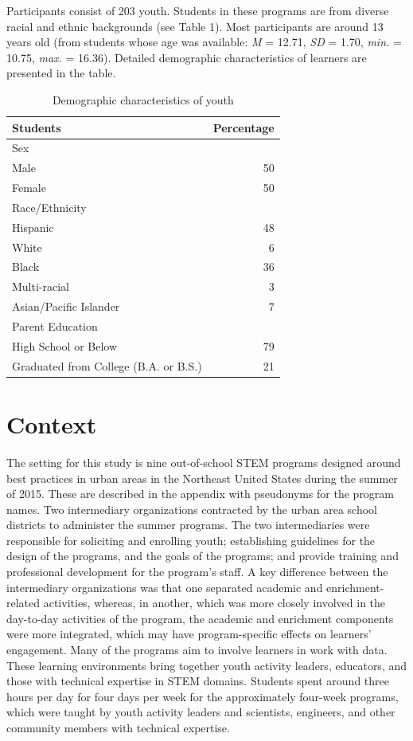 \documentclass[]{book}
\theoremstyle{definition}
\theoremstyle{definition}
\theoremstyle{definition}
\theoremstyle{remark}
\begin{document}
Participants consist of 203 youth. Students in these programs are from
diverse racial and ethnic backgrounds (see Table 1). Most participants
are around 13 years old (from students whose age was available: \emph{M}
= 12.71, \emph{SD} = 1.70, \emph{min.} = 10.75, \emph{max.} = 16.36).
Detailed demographic characteristics of learners are presented in the
table.

\begin{table}

\caption{\label{tab:unnamed-chunk-4}Demographic characteristics of youth}
\centering
\begin{tabular}[t]{lr}
\toprule
Students & Percentage\\
\midrule
Sex & \\
Male & 50\\
Female & 50\\
Race/Ethnicity & \\
Hispanic & 48\\
\addlinespace
White & 6\\
Black & 36\\
Multi-racial & 3\\
Asian/Pacific Islander & 7\\
Parent Education & \\
\addlinespace
High School or Below & 79\\
Graduated from College (B.A. or B.S.) & 21\\
\bottomrule
\end{tabular}
\end{table}

\section{Context}\label{context}

The setting for this study is nine out-of-school STEM programs designed
around best practices in urban areas in the Northeast United States
during the summer of 2015. These are described in the appendix with
pseudonyms for the program names. Two intermediary organizations
contracted by the urban area school districts to administer the summer
programs. The two intermediaries were responsible for soliciting and
enrolling youth; establishing guidelines for the design of the programs,
and the goals of the programs; and provide training and professional
development for the program's staff. A key difference between the
intermediary organizations was that one separated academic and
enrichment-related activities, whereas, in another, which was more
closely involved in the day-to-day activities of the program, the
academic and enrichment components were more integrated, which may have
program-specific effects on learners' engagement. Many of the programs
aim to involve learners in work with data. These learning environments
bring together youth activity leaders, educators, and those with
technical expertise in STEM domains. Students spent around three hours
per day for four days per week for the approximately four-week programs,
which were taught by youth activity leaders and scientists, engineers,
and other community members with technical expertise.
\end{document}
